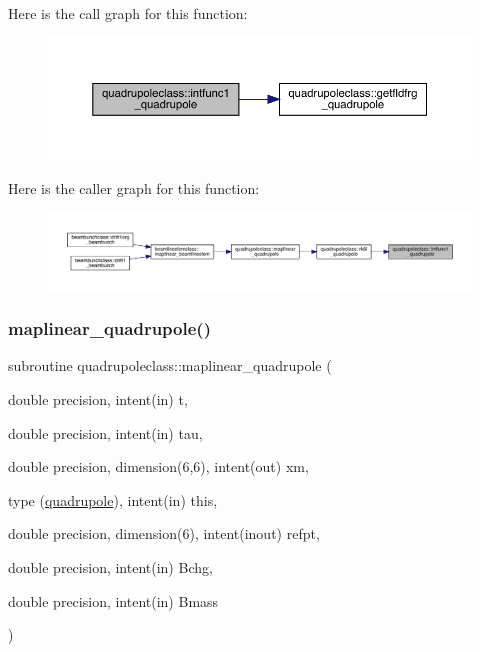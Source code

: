 Here is the call graph for this function\+:\nopagebreak
\begin{figure}[H]
\begin{center}
\leavevmode
\includegraphics[width=350pt]{namespacequadrupoleclass_a3cbe01df676294387d1293468425aa70_cgraph}
\end{center}
\end{figure}
Here is the caller graph for this function\+:\nopagebreak
\begin{figure}[H]
\begin{center}
\leavevmode
\includegraphics[width=350pt]{namespacequadrupoleclass_a3cbe01df676294387d1293468425aa70_icgraph}
\end{center}
\end{figure}
\mbox{\label{namespacequadrupoleclass_adcdf5386d19cfb0a90cbc42426cf0d44}} 
\subsubsection{\texorpdfstring{maplinear\_quadrupole()}{maplinear\_quadrupole()}}
{\footnotesize\ttfamily subroutine quadrupoleclass\+::maplinear\+\_\+quadrupole (\begin{DoxyParamCaption}\item[{double precision, intent(in)}]{t,  }\item[{double precision, intent(in)}]{tau,  }\item[{double precision, dimension(6,6), intent(out)}]{xm,  }\item[{type (\mbox{\hyperlink{namespacequadrupoleclass_structquadrupoleclass_1_1quadrupole}{quadrupole}}), intent(in)}]{this,  }\item[{double precision, dimension(6), intent(inout)}]{refpt,  }\item[{double precision, intent(in)}]{Bchg,  }\item[{double precision, intent(in)}]{Bmass }\end{DoxyParamCaption})}

